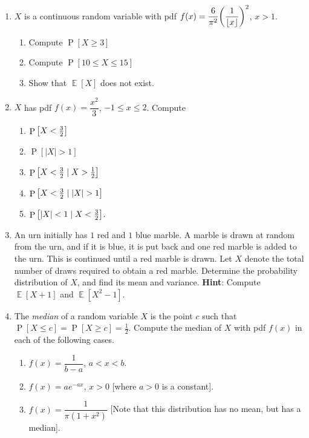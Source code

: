 \documentclass[svgnames]{amsart}
\DeclareMathOperator{\Prob}{P}
\DeclareMathOperator{\EV}{\mathbb E}
\begin{document}
\begin{enumerate}
\item $X$ is a continuous random variable with pdf $f(x) = \dfrac 6 {\pi^2} \pqty{\dfrac 1 {\lfloor x \rfloor}}^2$, $x > 1$.
\begin{enumerate}
	\item Compute $\Prob[X \ge 3]$
	\item Compute $\Prob[10 \le X \le 15]$
	\item Show that $\EV[X]$ does not exist.
\end{enumerate}

\item $X$ has pdf $f(x) = \dfrac{x^2}{3}$, $-1 \le x \le 2$. Compute
\begin{enumerate}
	\item $\Prob \bqty{X < \frac 3 2}$
	\item $\Prob[|X| > 1]$
	\item $\Prob \bqty{X < \frac 3 2 \mid X > \frac 1 2}$
	\item $\Prob \bqty{X < \frac 3 2 \mid |X| > 1}$
	\item $\Prob \bqty{|X| < 1 \mid X < \frac 3 2}$.
\end{enumerate}

\item An urn initially has {\color{red} $1$ red} and {\color{blue} $1$ blue} marble. A marble is drawn at random from the urn, and if it is {\color{blue} blue}, it is put back and {\color{red} one red} marble is added to the urn. This is continued until a {\color{red} red} marble is drawn. Let $X$ denote the total number of draws required to obtain a {\color{red} red} marble. Determine the probability distribution of $X$, and find its mean and variance.
{\scriptsize\textbf{Hint}: Compute $\EV[X + 1]$ and $\EV[X^2 - 1]$.}

\item The \emph{median} of a random variable $X$ is the point $c$ such that $\Prob[X \le c] = \Prob[X \ge c] = \frac 1 2$. Compute the median of $X$ with pdf $f(x)$ in each of the following cases.
\begin{enumerate}[itemsep=1em]
	\item $f(x) = \dfrac 1 {b - a}$, $a < x < b$.
	\item $f(x) = a e^{-ax}$, $x > 0$ [where $a > 0$ is a constant].
	\item $f(x) = \dfrac{1}{\pi(1 + x^2)}$ [Note that this distribution has no mean, but has a median].
\end{enumerate}
\end{enumerate}
\end{document}
